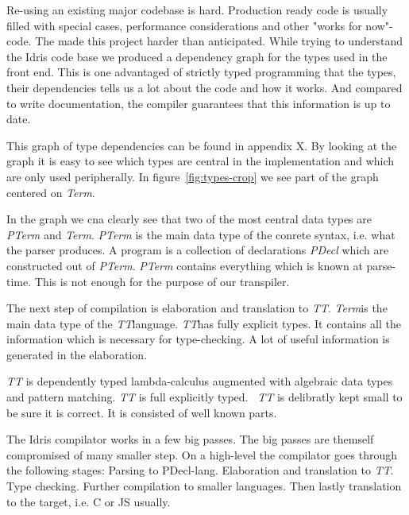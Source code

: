 Re-using an existing major codebase is hard. Production ready code is usually
filled with special cases, performance considerations and other "works for
now"-code. The made this project harder than anticipated. While trying to
understand the Idris code base we produced a dependency graph for the types
used in the front end. This is one advantaged of strictly typed programming
that the types, their dependencies tells us a lot about the code and how it
works. And compared to write documentation, the compiler guarantees that this
information is up to date.

\newcommand{\pterm}{\textit{PTerm}}
\newcommand{\pdecel}{\textit{PDecl}}
\newcommand{\term}{\textit{Term}}
\newcommand{\tti}{\textit{TT}}

This graph of type dependencies can be found in appendix X. By looking at the
graph it is easy to see which types are central in the implementation and which
are only used peripherally. In figure~\ref{fig:types-crop} we see part of the
graph centered on \textit{Term}.

In the graph we cna clearly see that two of the most central data types are
\textit{PTerm} and \textit{Term}. \textit{PTerm} is the main data type of the
conrete syntax, i.e. what the parser produces. A program is a collection of
declarations \textit{PDecl} which are constructed out of \pterm. \pterm
contains everything which is known at parse-time. This is not enough for the
purpose of our transpiler.

The next step of compilation is elaboration and translation to \tti. \term is
the main data type of the \tti language. \tti has fully explicit types. It
contains all the information which is necessary for type-checking. A lot of
useful information is generated in the elaboration.

\textit{TT} is dependently typed lambda-calculus augmented with algebraic data
types and pattern matching. \textit{TT} is full explicitly typed.~\cite{idris}
\textit{TT} is delibratly kept small to be sure it is correct. It is consisted
of well known parts.

The Idris compilator works in a few big passes. The big passes are themself
compromised of many smaller step. On a high-level the compilator goes through
the following stages: Parsing to PDecl-lang. Elaboration and translation to
\textit{TT}. Type checking. Further compilation to smaller languages. Then
lastly translation to the target, i.e. C or JS usually.

